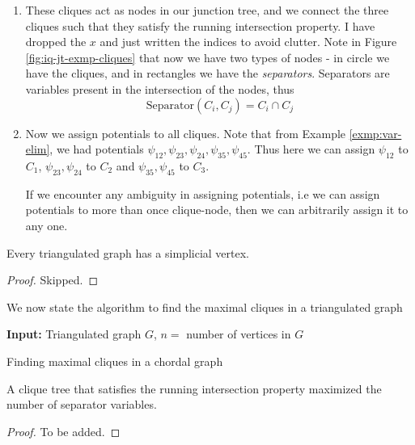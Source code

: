 \begin{exmp}
\begin{enumerate}
		\item These cliques act as nodes in our junction tree, and we connect the three cliques such that they satisfy the running intersection property. I have dropped the $x$ and just written the indices to avoid clutter. Note in Figure \ref{fig:iq-jt-exmp-cliques} that now we have two types of nodes - in circle we have the cliques, and in rectangles we have the \textit{separators}. Separators are variables present in the intersection of the nodes, thus
		\begin{equation}
		\text{Separator}(C_i, C_j) = C_i \cap C_j
		\end{equation}
	
		\item Now we assign potentials to all cliques. Note that from Example \ref{exmp:var-elim}, we had potentials $\psi_{12}, \psi_{23}, \psi_{24}, \psi_{35},\psi_{45}$. Thus here we can assign $\psi_{12}$ to $C_1$, $\psi_{23}, \psi_{24}$ to $C_2$ and $\psi_{35}, \psi_{45}$ to $C_3$. 
		\begin{rem}
		If we encounter any ambiguity in assigning potentials, i.e we can assign potentials to more than once clique-node, then we can arbitrarily assign it to any one.
		\end{rem}
	\end{enumerate}
\end{exmp}
\begin{thm}
Every triangulated graph has a simplicial vertex.
\end{thm}
\begin{proof}
Skipped.
\end{proof}
We now state the algorithm to find the maximal cliques in a triangulated graph \\
\begin{algorithm}[H]\label{alg:cliques-chordal}
	\DontPrintSemicolon
	\textbf{Input:} Triangulated graph $G$, $n=$ number of vertices in $G$\;
	\caption{Finding maximal cliques in a chordal graph}
\end{algorithm}
\begin{thm}
A clique tree that satisfies the running intersection property maximized the number of separator variables.
\end{thm}
\begin{proof}
To be added.
\end{proof}

